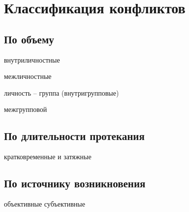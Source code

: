 \chapter{Классификация конфликтов}

\section{По объему}

внутриличностные

межличностные

личность -- группа (внутригрупповые)

межгрупповой


\section{По длительности протекания}

кратковременные и затяжные

\section{По источнику возникновения}

объективные субъективные


